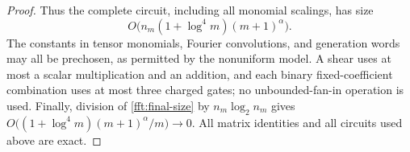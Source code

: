 \begin{proof}
Thus the complete circuit, including all monomial scalings, has size
\begin{equation}\label{fft:final-size}
 O\bigl(n_m(1+\log^4m)(m+1)^\alpha\bigr).
\end{equation}
The constants in tensor monomials, Fourier convolutions, and
generation words may all be prechosen, as permitted by the
nonuniform model.  A shear uses at most a scalar multiplication and
an addition, and each binary fixed-coefficient combination uses at
most three charged gates; no unbounded-fan-in operation is used.
Finally, division of \cref{fft:final-size} by
$n_m\log_2n_m$ gives
$O\bigl((1+\log^4m)(m+1)^\alpha/m\bigr)\to0$.
All matrix identities and all circuits used above are exact.
\end{proof}
